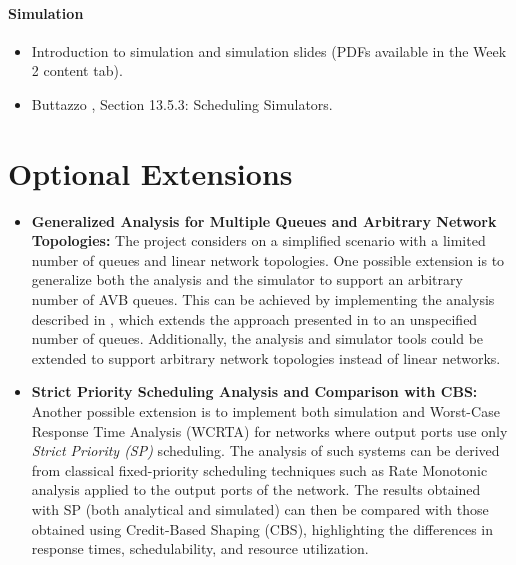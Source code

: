 \documentclass[a4paper,11pt]{article}
\begin{document}
\paragraph{Simulation}
\begin{itemize}
    \item Introduction to simulation and simulation slides (PDFs available in the Week 2 content tab).
    \item Buttazzo \cite{buttazzo2024}, Section 13.5.3: Scheduling Simulators.
\end{itemize}


\section{Optional Extensions}
\begin{itemize}

\item \textbf{Generalized Analysis for Multiple Queues and Arbitrary Network Topologies:}
The project considers on a simplified scenario with a limited number of queues and linear network topologies. One possible extension is to generalize both the analysis and the simulator to support an arbitrary number of AVB queues. This can be achieved by implementing the analysis described in \cite{Cao2018-IndependentWCRTAnalysis}, which extends the approach presented in \cite{Cao2016-IndependentTightWCRT} to an unspecified number of queues. Additionally, the analysis and simulator tools could be extended to support arbitrary network topologies instead of linear networks.

\item \textbf{Strict Priority Scheduling Analysis and Comparison with CBS:}
Another possible extension is to implement both simulation and Worst-Case Response Time Analysis (WCRTA) for networks where output ports use only \textit{Strict Priority (SP)} scheduling. The analysis of such systems can be derived from classical fixed-priority scheduling techniques such as Rate Monotonic analysis applied to the output ports of the network. The results obtained with SP (both analytical and simulated) can then be compared with those obtained using Credit-Based Shaping (CBS), highlighting the differences in response times, schedulability, and resource utilization.

\end{itemize}
\end{document}
